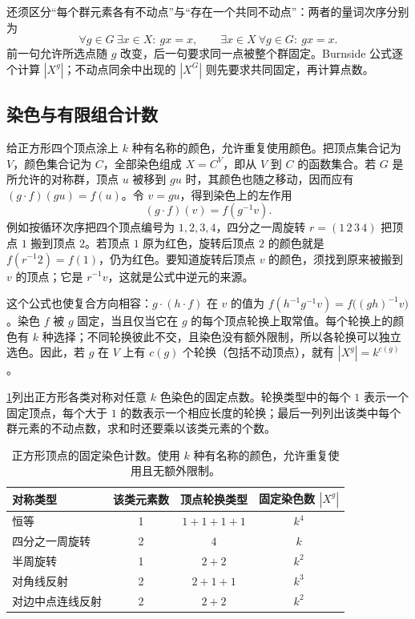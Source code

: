 \ProseParagraphBreak
还须区分“每个群元素各有不动点”与“存在一个共同不动点”：两者的量词次序分别为
\[
	\forall g\in G\ \exists x\in X:\ gx=x, \qquad \exists x\in X\ \forall g\in G:\ gx=x.
\]
前一句允许所选点随 \(g\) 改变，后一句要求同一点被整个群固定。Burnside 公式逐个计算 \(|X^g|\)；不动点同余中出现的 \(|X^G|\) 则先要求共同固定，再计算点数。

\subsection{染色与有限组合计数}
\label{b1:subsec:0403:02}

给正方形四个顶点涂上 \(k\) 种有名称的颜色，允许重复使用颜色。把顶点集合记为 \(V\)，颜色集合记为 \(C\)，全部染色组成 \(X=C^V\)，即从 \(V\) 到 \(C\) 的函数集合。若 \(G\) 是所允许的对称群，顶点 \(u\) 被移到 \(gu\) 时，其颜色也随之移动，因而应有 \((g\cdot f)(gu)=f(u)\)。令 \(v=gu\)，得到染色上的左作用
\[
	(g\cdot f)(v)=f(g^{-1}v).
\]
例如按循环次序把四个顶点编号为 \(1,2,3,4\)，四分之一周旋转 \(r=(1\,2\,3\,4)\) 把顶点 \(1\) 搬到顶点 \(2\)。若顶点 \(1\) 原为红色，旋转后顶点 \(2\) 的颜色就是 \(f(r^{-1}2)=f(1)\)，仍为红色。要知道旋转后顶点 \(v\) 的颜色，须找到原来被搬到 \(v\) 的顶点；它是 \(r^{-1}v\)，这就是公式中逆元的来源。

\ProseParagraphBreak
这个公式也使复合方向相容：\(g\cdot(h\cdot f)\) 在 \(v\) 的值为 \(f(h^{-1}g^{-1}v)=f\bigl((gh)^{-1}v\bigr)\)。染色 \(f\) 被 \(g\) 固定，当且仅当它在 \(g\) 的每个顶点轮换上取常值。每个轮换上的颜色有 \(k\) 种选择；不同轮换彼此不交，且染色没有额外限制，所以各轮换可以独立选色。因此，若 \(g\) 在 \(V\) 上有 \(c(g)\) 个轮换（包括不动顶点），就有 \(|X^g|=k^{c(g)}\)。

\ProseParagraphBreak
\cref{b1:tab:square-fixed-colorings}列出正方形各类对称对任意 \(k\) 色染色的固定点数。轮换类型中的每个 \(1\) 表示一个固定顶点，每个大于 \(1\) 的数表示一个相应长度的轮换；最后一列列出该类中每个群元素的不动点数，求和时还要乘以该类元素的个数。

\begin{table}[htbp]
	\centering
	\caption[正方形顶点的固定染色计数]{正方形顶点的固定染色计数。使用 \(k\) 种有名称的颜色，允许重复使用且无额外限制。}
	\label{b1:tab:square-fixed-colorings}
	\begin{tabular}{lccc}
		\toprule
		对称类型 & 该类元素数 & 顶点轮换类型 & 固定染色数 \(|X^g|\) \\
		\midrule
		恒等 & 1 & \(1+1+1+1\) & \(k^4\) \\
		四分之一周旋转 & 2 & \(4\) & \(k\) \\
		半周旋转 & 1 & \(2+2\) & \(k^2\) \\
		对角线反射 & 2 & \(2+1+1\) & \(k^3\) \\
		对边中点连线反射 & 2 & \(2+2\) & \(k^2\) \\
		\bottomrule
	\end{tabular}
\end{table}

